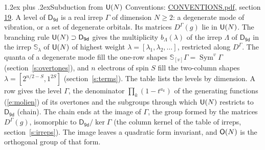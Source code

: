 \documentclass[10pt,a4paper]{article}
\makeatletter
\renewcommand\section{\@startsection{section}{1}{\z@}{-3ex plus -1ex minus -.2ex}%
  {1.2ex plus .2ex}{\normalfont\large\sffamily\bfseries\color{parttitle}}}
\numberwithin{equation}{section}
\newcommand{\grp}[1]{\mathsf{#1}}
\newcommand{\repD}[1]{D^{#1}}
\newcommand{\schur}[1]{\mathbb{S}_{#1}}
\newcommand{\shape}[1]{[#1]}
\makeatother
\begin{document}
\section{Subduction from \texorpdfstring{$\grp{U(\mathnormal{N})}$}{U(N)}}\label{s:unitary}
Conventions: \href{../../CONVENTIONS.pdf}{CONVENTIONS.pdf}, section \href{../../CONVENTIONS.pdf\#conv.19}{19}.
\leavevmode\label{n:local.level.dimension}A level of $\grp{D_{9d}}$ is a real irrep $\Gamma$ of dimension $N \ge 2$: a degenerate mode of vibration, or a set of degenerate orbitals. \label{n:group.unitary}Its matrices $\repD{\Gamma}(g)$ lie in $\grp{U(\mathnormal{N})}$. \label{n:irrep.schur}\label{n:shape.partition}\label{n:local.partition}\label{n:function.multiplicity.unitary}The branching rule $\grp{U(\mathnormal{N})} \supset \grp{D_{9d}}$ gives the multiplicity $b_\Lambda(\lambda)$ of the irrep $\Lambda$ of $\grp{D_{9d}}$ in the irrep $\schur{\lambda}$ of $\grp{U(\mathnormal{N})}$ of highest weight $\lambda = \shape{\lambda_1, \lambda_2, \dots}$, restricted along $\repD{\Gamma}$. \label{n:local.partition.power}\label{n:local.electrons}\label{n:local.spin}The quanta of a degenerate mode fill the one-row shapes $\schur{\shape{v}}\Gamma = \operatorname{Sym}^{v}\Gamma$ (section~\ref{s:overtones}), and $n$ electrons of spin $S$ fill the two-column shapes $\lambda = \shape{2^{n/2-S}, 1^{2S}}$ (section~\ref{s:terms}).
The table lists the levels by dimension. \label{n:head.level}\label{n:head.denominator}\label{n:index.overtone.denominator}\label{n:head.chain}A row gives the level $\Gamma$, the denominator $\prod_k (1 - t^{a_k})$ of the generating functions (\ref{e:molien}) of its overtones and the subgroups through which $\grp{U(\mathnormal{N})}$ restricts to $\grp{D_{9d}}$ (chain). The chain ends at the image of $\Gamma$, the group formed by the matrices $\repD{\Gamma}(g)$, isomorphic to $\grp{D_{9d}}/\ker\Gamma$ (the column kernel of the table of irreps, section~\ref{s:irreps}). The image leaves a quadratic form invariant, and $\grp{O(\mathnormal{N})}$ is the orthogonal group of that form.
\end{document}
